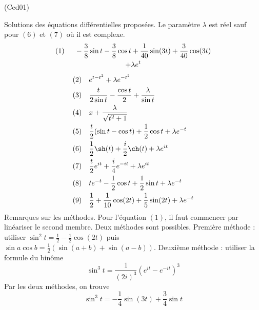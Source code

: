 \begin{tiny}(Ced01)\end{tiny} Solutions des équations différentielles proposées. Le paramètre $\lambda$ est réel sauf pour $(6)$ et $(7)$ où il est complexe.
\begin{multline*}
 (1)\hspace{0.5cm} -\frac{3}{8}\sin t -\frac{3}{8}\cos t + \frac{1}{40}\sin (3t)+\frac{3}{40}\cos(3t)\\ + \lambda e^{t}
\end{multline*}
\begin{align*}
&(2)&  &e^{t-t^2} + \lambda e^{-t^2}\\
&(3)&  &\frac{t}{2\sin t} - \frac{\cos t}{2} + \frac{\lambda}{\sin t}\\
&(4)& &x+\frac{\lambda}{\sqrt{t^2+1}} \\
&(5)& &\frac{t}{2}(\sin t - \cos t)+\frac{1}{2}\cos t + \lambda e^{-t}\\
&(6)& &\frac{1}{2}\sh(t)+\frac{i}{2}\ch(t) + \lambda e^{it} \\
&(7)& &\frac{t}{2}e^{it}+\frac{i}{4}e^{-it}+ \lambda e^{it} \\
&(8)& &te^{-t} -\frac{1}{2}\cos t + \frac{1}{2}\sin t + \lambda e^{-t}\\
&(9)& &\frac{1}{2} + \frac{1}{10}\cos (2t) + \frac{1}{5}\sin(2t) + \lambda e^{-t}
\end{align*}
Remarques sur les méthodes.\newline
Pour l'équation $(1)$, il faut commencer par linéariser le second membre. Deux méthodes sont possibles.\newline
 Première méthode : utiliser $\sin^2 t = \frac{1}{2}-\frac{1}{2}\cos(2t)$ puis $\sin a \cos b = \frac{1}{2}\left(\sin(a+b)+\sin(a-b) \right)$.\newline
Deuxième méthode : utiliser la formule du binôme
\begin{displaymath}
 \sin ^3 t = \frac{1}{(2i)^3}\left(e^{it}-e^{-it} \right)^3 
\end{displaymath}
Par les deux méthodes, on trouve
\begin{displaymath}
 \sin ^3 t = -\frac{1}{4}\sin(3t) + \frac{3}{4}\sin t
\end{displaymath}
  


